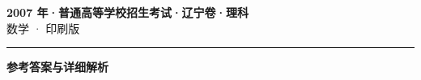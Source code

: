 \documentclass[zihao=5, a4paper]{ctexart}
\begin{document}
\begin{center}
  {\Large\bfseries 2007 年·普通高等学校招生考试·辽宁卷·理科}\\[4pt]
  {\large 数学 · 印刷版}
\end{center}
\medskip
{}

\par\bigskip\hrule\bigskip
{}
\begin{center}{\large\bfseries 参考答案与详细解析}\end{center}
\smallskip

\end{document}
